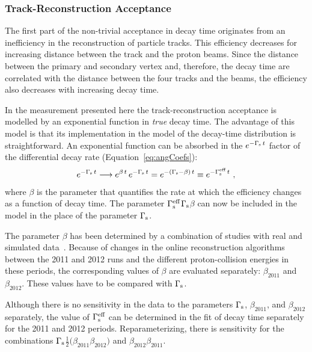 \subsubsection{Track-Reconstruction Acceptance}
The first part of the non-trivial acceptance in decay time originates from an inefficiency in the reconstruction of particle tracks. This
efficiency decreases for increasing distance between the track and the proton beams. Since the distance between the primary and secondary
vertex and, therefore, the decay time are correlated with the distance between the four \BstoJpsiKK{} tracks and the beams, the efficiency
also decreases with increasing decay time.

In the measurement presented here the track-reconstruction acceptance is modelled by an exponential function in \emph{true} decay time. The
advantage of this model is that its implementation in the model of the decay-time distribution is straightforward. An exponential function
can be absorbed in the $e^{-\Gamma_\text{s}\,t}$ factor of the differential decay rate (Equation~\ref{eq:angCoefs}):
\begin{equation}
  e^{-\Gamma_\text{s}\,t} \longrightarrow e^{\beta\,t}\,e^{-\Gamma_\text{s}\,t} = e^{-(\Gamma_\text{s}-\beta)\,t} \equiv e^{-\Gamma_\text{s}^\text{eff}\,t}\ ,
\end{equation}
where $\beta$ is the parameter that quantifies the rate at which the efficiency changes as a function of decay time. The parameter
$\Gamma_\text{s}^\text{eff}$\textequiv$\Gamma_\text{s}$\textminus$\beta$ can now be included in the model in the place of the parameter $\Gamma_\text{s}$.

The parameter $\beta$ has been determined by a combination of studies with real and simulated data~\cite{LHCb-ANA-2014-039}. Because of
changes in the online reconstruction algorithms between the 2011 and 2012 runs and the different proton-collision energies in these
periods, the corresponding values of $\beta$ are evaluated separately: $\beta_\text{2011}$\texteq\mbox{\unitsp\invps}
and $\beta_\text{2012}$\texteq\mbox{\unitsp\invps}. These values have to be compared with
$\Gamma_\text{s}$\unitsp\invps.

Although there is no sensitivity in the \BstoJpsiKK{} data to the parameters $\Gamma_\text{s}$, $\beta_\text{2011}$, and $\beta_\text{2012}$
separately, the value of $\Gamma_\text{s}^\text{eff}$ can be determined in the fit of decay time separately for the 2011 and 2012 periods.
Reparameterizing, there is sensitivity for the combinations $\Gamma_\text{s}$\textminus$\tfrac{1}{2}(\beta_\text{2011}$\textplus$\beta_\text{2012})$
and $\beta_\text{2012}$\textminus$\beta_\text{2011}$.

